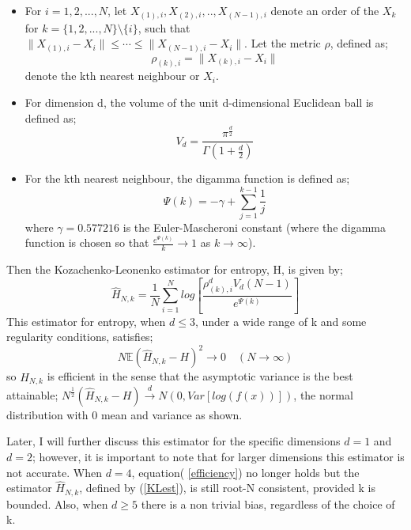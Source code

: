 \documentclass{article}
\begin{document}
\begin{itemize}

\item For $i = 1, 2, ..., N$, let $X_{(1), i}, X_{(2), i}, .., X_{(N-1), i}$ denote an order of the $X_{k}$ for $k = \{1, 2, ..., N\} \setminus \{i\}$, such that $\| X_{(1), i} - X_{i}\| \leq \cdots \leq \|  X_{(N-1), i} - X_{i}\| $. Let the metric $\rho$, defined as;
\begin{equation}
\rho_{(k), i} = \| X_{(k), i} - X_{i}\|
\end{equation} denote the kth nearest neighbour or $X_{i}$.

\item  For dimension d, the volume of the unit d-dimensional Euclidean ball is defined as;
\begin{equation}
V_{d} = \frac{\pi^\frac{d}{2}}{\Gamma(1 + \frac{d}{2})}
\end{equation}

\item For the kth nearest neighbour, the digamma function is defined as;
\begin{equation}
\Psi(k) = -\gamma + \sum_{j=1}^{k-1} \frac{1}{j}
\end{equation}
where $\gamma = 0.577216$ is the Euler-Mascheroni constant (where the digamma function is chosen so that $\frac{e^{\Psi(k)}}{k}\to1$ as $k \to \infty$).

\end{itemize} Then the Kozachenko-Leonenko estimator for entropy, H, is given by;
\begin{equation} \label{KLest}
\hat{H}_{N, k} = \frac{1}{N} \sum_{i=1}^{N} log \left[ \frac{\rho_{(k),i}^{d} V_{d} (N-1)}{e^{\Psi(k)}} \right]
\end{equation} This estimator for entropy, when $d \leq 3$, under a wide range of k and some regularity conditions, satisfies;
\begin{equation} \label{efficiency}
N \mathbb{E} {(\hat{H}_{N, k} - H)^2} \to 0 \quad  (N \to \infty)
\end{equation} so $\hat{H}_{N, k}$ is efficient in the sense that the asymptotic variance is the best attainable; $N^{\frac{1}{2}}(\hat{H}_{N, k} - H) \xrightarrow{d} N(0, Var[log(f(x))])$, the normal distribution with 0 mean and variance as shown.

Later, I will further discuss this estimator for the specific dimensions $d=1$ and $d=2$; however, it is important to note that for larger dimensions this estimator is not accurate. When $d=4$, equation( \ref{efficiency}) no longer holds but the estimator $\hat{H}_{N, k}$, defined by (\ref{KLest}), is still root-N consistent, provided k is bounded. Also, when $d \geq 5$ there is a non trivial bias, regardless of the choice of k. 
\end{document}
